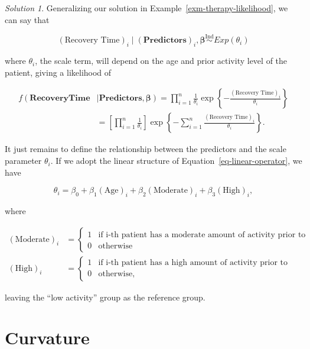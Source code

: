\documentclass[
  letterpaper,
  DIV=11,
  numbers=noendperiod]{scrreprt}
\theoremstyle{definition}
\theoremstyle{plain}
\theoremstyle{definition}
\theoremstyle{remark}
\newtheorem*{solution}{Solution}
\begin{document}
\begin{solution}

Generalizing our solution in Example~\ref{exm-therapy-likelihood}, we
can say that

\[(\text{Recovery Time})_i \mid (\mathbf{Predictors})_i, \boldsymbol{\beta} \stackrel{\text{Ind}}{\sim}Exp\left(\theta_i\right)\]

where \(\theta_i\), the scale term, will depend on the age and prior
activity level of the patient, giving a likelihood of

\[
\begin{aligned}
f\left(\mathbf{Recovery Time} \right. &\mid \left. \mathbf{Predictors}, \boldsymbol{\beta}\right) 
    = \prod_{i=1}^{n} \frac{1}{\theta_i} \exp\left\{- \frac{(\text{Recovery Time})_i}{\theta_i}\right\} \\
    &= \left[\prod_{i=1}^{n} \frac{1}{\theta_i}\right] \exp\left\{-\sum_{i=1}^{n} \frac{(\text{Recovery Time})_i}{\theta_i}\right\}.
\end{aligned}
\]

It just remains to define the relationship between the predictors and
the scale parameter \(\theta_i\). If we adopt the linear structure of
Equation~\ref{eq-linear-operator}, we have

\[\theta_i = \beta_0 + \beta_1 (\text{Age})_i + \beta_2 (\text{Moderate})_i + \beta_3 (\text{High})_i,\]

where

\[
\begin{aligned}
  (\text{Moderate})_i 
    &= \begin{cases} 1 & \text{if i-th patient has a moderate amount of activity prior to surgery} \\ 0 & \text{otherwise} \end{cases} \\
  (\text{High})_i
    &= \begin{cases} 1 & \text{if i-th patient has a high amount of activity prior to surgery} \\ 0 & \text{otherwise}, \end{cases}
\end{aligned}
\]

leaving the ``low activity'' group as the reference group.

\end{solution}

\hypertarget{curvature}{%
\section{Curvature}\label{curvature}}
\end{document}
